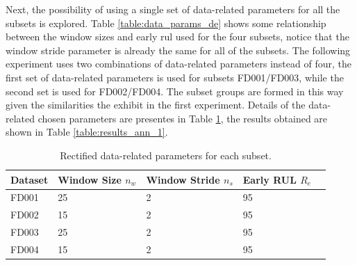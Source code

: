 Next, the possibility of using a single set of data-related parameters for all the subsets is explored. Table \ref{table:data_params_de} shows some relationship between the window sizes and early \gls{rul} used for the four subsets,  notice that the window stride parameter is already the same for all of the subsets. The following experiment uses two combinations of data-related parameters instead of four, the first set of data-related parameters is used for subsets FD001/FD003, while the second set is used for  FD002/FD004. The subset groups are formed in this way given the similarities the exhibit in the first experiment. Details of the data-related chosen parameters are presentes in Table \ref{table:data_params_1}, the results obtained are shown in Table \ref{table:results_ann_1}. 

\begin{table}[!htb]
\centering
\begin{tabular}{l l l l l}
	\hline
	 Dataset & Window Size $n_w$ & Window Stride $n_s$ & Early RUL $R_e$\\
  	\hline
  	FD001 & 25 & 2 & 95\\
  	FD002 & 15 & 2 & 95\\
  	FD003 & 25 & 2 & 95\\
  	FD004 & 15 & 2 & 95\\
  	\hline
\end{tabular}
\caption{Rectified data-related parameters for each subset.}
\label{table:data_params_1}
\end{table}  

